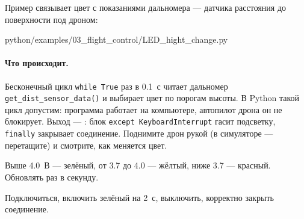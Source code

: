 Пример связывает цвет с показаниями дальномера --- датчика расстояния до поверхности под дроном:

\begin{codefile}[python]{python/examples/03_flight_control/LED_hight_change.py}
\end{codefile}

\paragraph{Что происходит.} Бесконечный цикл \verb|while True| раз в 0.1~с читает дальномер \verb|get_dist_sensor_data()| и выбирает цвет по порогам высоты. В Python такой цикл допустим: программа работает на компьютере, автопилот дрона он не блокирует. Выход --- : блок \verb|except KeyboardInterrupt| гасит подсветку, \verb|finally| закрывает соединение. Поднимите дрон рукой (в симуляторе --- перетащите) и смотрите, как меняется цвет.

\begin{taskbox}
Выше 4.0~В --- зелёный, от 3.7 до 4.0 --- жёлтый, ниже 3.7 --- красный. Обновлять раз в секунду.
\end{taskbox}

\begin{taskbox}
Подключиться, включить зелёный на 2~с, выключить, корректно закрыть соединение.
\end{taskbox}
